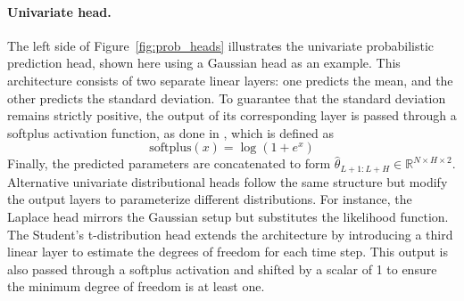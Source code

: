 \documentclass[a4paper,oneside,bibliography=totoc]{scrbook}
\begin{document}
\paragraph{Univariate head.}
The left side of Figure~\ref{fig:prob_heads} illustrates the univariate probabilistic prediction head, shown here using a Gaussian head as an example. This architecture consists of two separate linear layers: one predicts the mean, and the other predicts the standard deviation. To guarantee that the standard deviation remains strictly positive, the output of its corresponding layer is passed through a softplus activation function, as done in \cite{salinas_deepar_2020, salinas_high-dimensional_2019, sprangers_parameter-efficient_2023}, which is defined as
\begin{equation}
 \text{softplus}(x) = \log(1 + e^{x})
    \label{eq:softplus}
\end{equation}
Finally, the predicted parameters are concatenated to form $\hat{\theta}_{L+1:L+H} \in \mathbb{R}^{N \times H \times 2}$. %
Alternative univariate distributional heads follow the same structure but modify the output layers to parameterize different distributions. For instance, the Laplace head mirrors the Gaussian setup but substitutes the likelihood function. The Student’s t-distribution head extends the architecture by introducing a third linear layer to estimate the degrees of freedom for each time step. This output is also passed through a softplus activation and shifted by a scalar of 1 to ensure the minimum degree of freedom is at least one.
\end{document}
